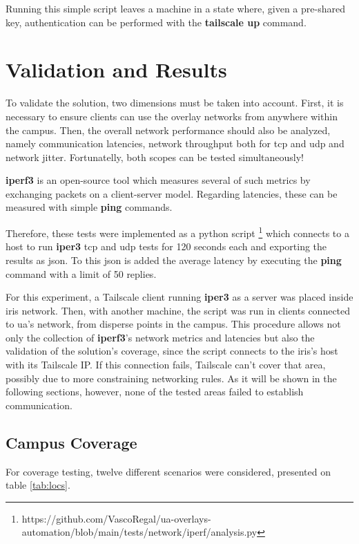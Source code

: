 \documentclass[11pt,twoside,a4paper]{report}
\begin{document}
Running this simple script leaves a machine in a state where, given a pre-shared key, authentication can be performed with the \textbf{tailscale up} command.

\chapter{Validation and Results}
\label{chap:results}

To validate the solution, two dimensions must be taken into account. First, it is necessary to ensure clients can use the overlay networks from anywhere within the campus. Then, the overall network performance should also be analyzed, namely communication latencies, network throughput both for \ac{tcp} and \ac{udp} and network jitter. Fortunatelly, both scopes can be tested simultaneously!

\textbf{iperf3} is an open-source tool which measures several of such metrics by exchanging packets on a client-server model. Regarding latencies, these can be measured with simple \textbf{ping} commands.

Therefore, these tests were implemented as a python script \footnote{https://github.com/VascoRegal/ua-overlays-automation/blob/main/tests/network/iperf/analysis.py} which connects to a host to run \textbf{iper3} \ac{tcp} and \ac{udp} tests for 120 seconds each and exporting the results as \ac{json}. To this \ac{json} is added the average latency by executing the \textbf{ping} command with a limit of 50 replies.

For this experiment, a Tailscale client running \textbf{iper3} as a server was placed inside \ac{iris} network. Then, with another machine, the script was run in clients connected to \ac{ua}'s network, from disperse points in the campus. This procedure allows not only the collection of \textbf{iperf3}'s network metrics and latencies but also the validation of the solution's coverage, since the script connects to the \ac{iris}'s host with its Tailscale IP. If this connection fails, Tailscale can't cover that area, possibly due to more constraining networking rules. As it will be shown in the following sections, however, none of the tested areas failed to establish communication.

\section{Campus Coverage}

For coverage testing, twelve different scenarios were considered, presented on table \ref{tab:locs}.
\end{document}
